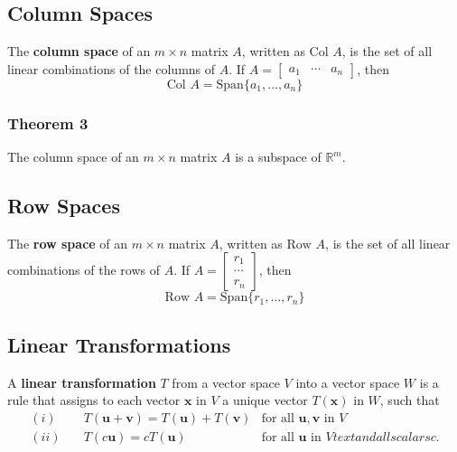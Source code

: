 \documentclass{article}
\begin{document}
\vspace{1em}

\subsection*{Column Spaces}
The \textbf{column space} of an $m\times n$ matrix $A$, written as $\text{Col } A$, is the set of
all linear combinations of the columns of $A$. If
$A=\begin{bmatrix}a_1 & \cdots & a_n\end{bmatrix}$, then
\[\text{Col } A = \text{Span}\{a_1, \ldots, a_n\}\]

\subsubsection*{Theorem 3}
The column space of an $m\times n$ matrix $A$ is a subspace of $\mathbb{R}^m$.

\subsection*{Row Spaces}
The \textbf{row space} of an $m\times n$ matrix $A$, written as $\text{Row } A$, is the set of all
linear combinations of the rows of $A$. If $A=\begin{bmatrix}r_1 \\ \cdots \\ r_n\end{bmatrix}$,
then
\[\text{Row } A = \text{Span}\{r_1, \ldots, r_n\}\]

\subsection*{Linear Transformations}
A \textbf{linear transformation} $T$ from a vector space $V$ into a vector space $W$ is a rule that
assigns to each vector $\mathbf{x}$ in $V$ a unique vector $T(\mathbf{x})$ in $W$, such that
\begin{align*}
    (i) &\quad T(\mathbf{u} + \mathbf{v}) = T(\mathbf{u}) + T(\mathbf{v}) & \text{for all }
    \mathbf{u}, \mathbf{v} \text{ in } V \\
    (ii) &\quad T(c \mathbf{u}) = c T(\mathbf{u}) & \text{for all } \mathbf{u} \text{ in } V 
    text{ and all scalars } c.
\end{align*}
\end{document}
